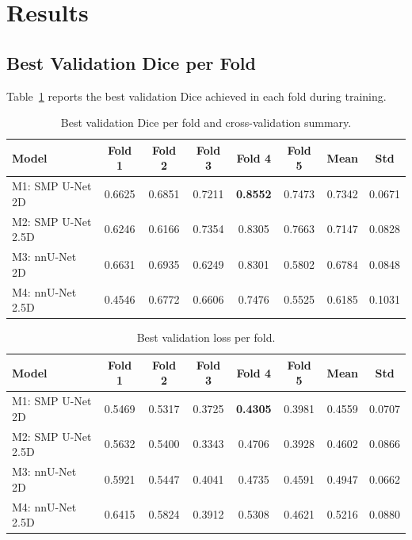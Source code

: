 \documentclass[11pt,a4paper]{article}
\begin{document}
\section{Results}

\subsection{Best Validation Dice per Fold}

Table~\ref{tab:val_dice} reports the best validation Dice achieved in each fold during training.

\begin{table}[H]
\centering
\caption{Best validation Dice per fold and cross-validation summary.}
\label{tab:val_dice}
\begin{tabular}{lccccccc}
\toprule
\textbf{Model} & \textbf{Fold 1} & \textbf{Fold 2} & \textbf{Fold 3} & \textbf{Fold 4} & \textbf{Fold 5} & \textbf{Mean} & \textbf{Std} \\
\midrule
M1: SMP U-Net 2D    & 0.6625 & 0.6851 & 0.7211 & \textbf{0.8552} & 0.7473 & 0.7342 & 0.0671 \\
M2: SMP U-Net 2.5D  & 0.6246 & 0.6166 & 0.7354 & 0.8305 & 0.7663 & 0.7147 & 0.0828 \\
M3: nnU-Net 2D      & 0.6631 & 0.6935 & 0.6249 & 0.8301 & 0.5802 & 0.6784 & 0.0848 \\
M4: nnU-Net 2.5D    & 0.4546 & 0.6772 & 0.6606 & 0.7476 & 0.5525 & 0.6185 & 0.1031 \\
\bottomrule
\end{tabular}
\end{table}

\begin{table}[H]
\centering
\caption{Best validation loss per fold.}
\label{tab:val_loss}
\begin{tabular}{lccccccc}
\toprule
\textbf{Model} & \textbf{Fold 1} & \textbf{Fold 2} & \textbf{Fold 3} & \textbf{Fold 4} & \textbf{Fold 5} & \textbf{Mean} & \textbf{Std} \\
\midrule
M1: SMP U-Net 2D    & 0.5469 & 0.5317 & 0.3725 & \textbf{0.4305} & 0.3981 & 0.4559 & 0.0707 \\
M2: SMP U-Net 2.5D  & 0.5632 & 0.5400 & 0.3343 & 0.4706 & 0.3928 & 0.4602 & 0.0866 \\
M3: nnU-Net 2D      & 0.5921 & 0.5447 & 0.4041 & 0.4735 & 0.4591 & 0.4947 & 0.0662 \\
M4: nnU-Net 2.5D    & 0.6415 & 0.5824 & 0.3912 & 0.5308 & 0.4621 & 0.5216 & 0.0880 \\
\bottomrule
\end{tabular}
\end{table}
\end{document}

